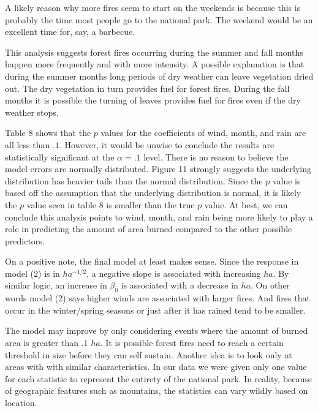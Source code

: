 \documentclass[11pt]{report}
\begin{document}
A likely reason why more fires seem to start on the weekends is because this is probably the time most people go to the national park. The weekend would be an excellent time for, say, a barbecue.

This analysis suggests forest fires occurring during the summer and fall months happen more frequently and with more intensity. A possible explanation is that during the summer months long periods of dry weather can leave vegetation dried out. The dry vegetation in turn provides fuel for forest fires. During the fall months it is possible the turning of leaves provides fuel for fires even if the dry weather stops.

Table 8 shows that the $p$ values for the coefficients of wind, month, and rain are all less than $.1$. However, it would be unwise to conclude the results are statistically significant at the $\alpha = .1$ level. There is no reason to believe the model errors are normally distributed. Figure 11 strongly suggests the underlying distribution has heavier tails than the normal distribution. Since the $p$ value is based off the assumption that the underlying distribution is normal, it is likely the $p$ value seen in table 8 is smaller than the true $p$ value. At best, we can conclude this analysis points to wind, month, and rain being more likely to play a role in predicting the amount of area burned compared to the other possible predictors.

On a positive note, the final model at least makes sense. Since the response in model (2) is in  $ha^{-1/2}$, a negative slope is associated with increasing $ha$. By similar logic, an increase in $\beta_0$ is associated with a decrease in $ha$. On other words model (2) says higher winds are associated with larger fires. And fires that occur in the winter/spring seasons or just after it has rained tend to be smaller. 

The model may improve by only considering events where the amount of burned area is greater than .1 $ha$. It is possible forest fires need to reach a certain threshold in size before they can self sustain. Another idea is to look only at areas with with similar characteristics. In our data we were given only one value for each statistic to represent the entirety of the national park. In reality, because of geographic features such as mountains, the statistics can vary wildly based on location.



\newpage
\phantom{1}
\newpage
\end{document}
